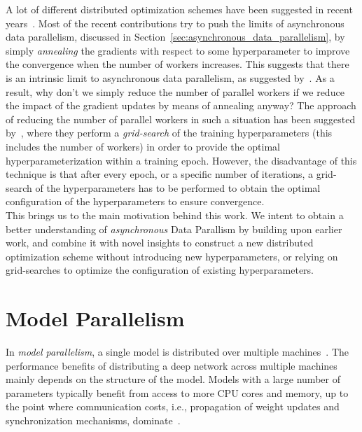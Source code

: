 A lot of different distributed optimization schemes have been suggested in recent years~\cite{zhang2015deep, dean2012large, hadjis2016omnivore}. Most of the recent contributions try to push the limits of asynchronous data parallelism, discussed in Section~\ref{sec:asynchronous_data_parallelism}, by simply \emph{annealing} the gradients with respect to some hyperparameter to improve the convergence when the number of workers increases. This suggests that there is an intrinsic limit to asynchronous data parallelism, as suggested by~\cite{implicitmomentum}. As a result, why don't we simply reduce the number of parallel workers if we reduce the impact of the gradient updates by means of annealing anyway? The approach of reducing the number of parallel workers in such a situation has been suggested by~\cite{hadjis2016omnivore}, where they perform a \emph{grid-search} of the training hyperparameters (this includes the number of workers) in order to provide the optimal hyperparameterization within a training epoch. However, the disadvantage of this technique is that after every epoch, or a specific number of iterations, a grid-search of the hyperparameters has to be performed to obtain the optimal configuration of the hyperparameters to ensure convergence.\\

This brings us to the main motivation behind this work. We intent to obtain a better understanding of \emph{asynchronous} Data Parallism by building upon earlier work, and combine it with novel insights to construct a new distributed optimization scheme without introducing new hyperparameters, or relying on grid-searches to optimize the configuration of existing hyperparameters.

\section{Model Parallelism}
\label{sec:intro_model_parallelism}

In \emph{model parallelism}, a single model is distributed over multiple machines~\cite{dean2012large}. The performance benefits of distributing a deep network across multiple machines mainly depends on the structure of the model. Models with a large number of parameters typically benefit from access to more CPU cores and memory, up to the point where communication costs, i.e., propagation of weight updates and synchronization mechanisms, dominate~\cite{dean2012large}.\\

